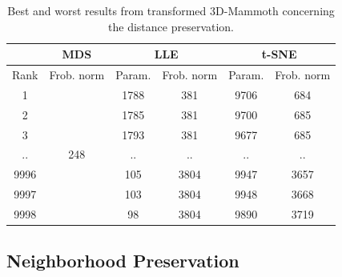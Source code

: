 \begin{table}[]
\centering
\begin{tabular}{|c|cl|cc|cc|}
\hline
 & \multicolumn{2}{c|}{{\color[HTML]{1b9e77} \textbf{MDS}}} & \multicolumn{2}{c|}{{\color[HTML]{d95f02} \textbf{LLE}}} & \multicolumn{2}{c|}{{\color[HTML]{7570B3} \textbf{t-SNE}}} \\ \hline
Rank & \multicolumn{2}{c|}{Frob. norm} & \multicolumn{1}{c|}{Param.} & Frob. norm & \multicolumn{1}{c|}{Param.} & Frob. norm \\ \hline
1 & \multicolumn{2}{c|}{\multirow{7}{*}{248}} & \multicolumn{1}{c|}{1788} & 381 & \multicolumn{1}{c|}{9706} & 684 \\ \cline{1-1} \cline{4-7} 
2 & \multicolumn{2}{c|}{} & \multicolumn{1}{c|}{1785} & 381 & \multicolumn{1}{c|}{9700} & 685 \\ \cline{1-1} \cline{4-7} 
3 & \multicolumn{2}{c|}{} & \multicolumn{1}{c|}{1793} & 381 & \multicolumn{1}{c|}{9677} & 685 \\ \cline{1-1} \cline{4-7} 
.. & \multicolumn{2}{c|}{} & \multicolumn{1}{c|}{..} & .. & \multicolumn{1}{c|}{..} & .. \\ \cline{1-1} \cline{4-7} 
9996 & \multicolumn{2}{c|}{} & \multicolumn{1}{c|}{105} & 3804 & \multicolumn{1}{c|}{9947} & 3657 \\ \cline{1-1} \cline{4-7} 
9997 & \multicolumn{2}{c|}{} & \multicolumn{1}{c|}{103} & 3804 & \multicolumn{1}{c|}{9948} & 3668 \\ \cline{1-1} \cline{4-7} 
9998 & \multicolumn{2}{c|}{} & \multicolumn{1}{c|}{98} & 3804 & \multicolumn{1}{c|}{9890} & 3719 \\ \hline
\end{tabular}
\caption[Transformed 3D-Mammoth Distance Preservation]{Best and worst results from transformed 3D-Mammoth concerning the distance preservation.}
\label{tab:best_worst_dist_transMammoth}
\end{table}

\subsection{Neighborhood Preservation}

